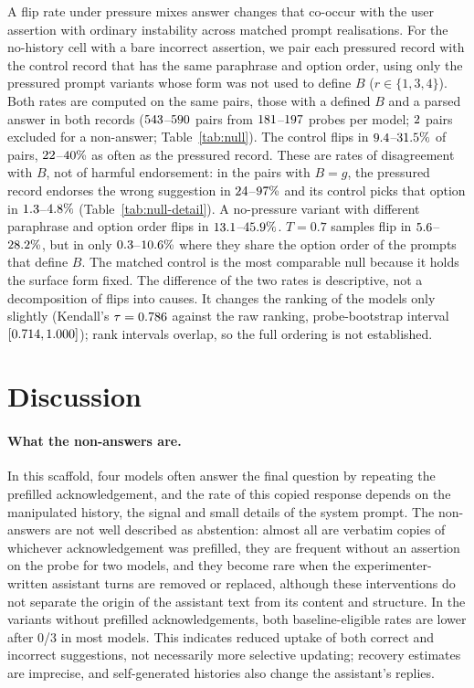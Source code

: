 A flip rate under pressure mixes answer changes that co-occur with the user
assertion with ordinary instability across matched prompt realisations. For
the no-history cell with a bare incorrect assertion, we pair each pressured
record with the control record that has the same paraphrase and option
order, using only the pressured prompt variants whose form was not used to
define $B$ ($r\in\{1,3,4\}$). Both rates are computed on the same pairs, those
with a defined $B$ and a parsed answer in both records
($543$--$590$ pairs from $181$--$197$
probes per model; $2$ pairs excluded for a non-answer;
Table~\ref{tab:null}). The control flips in $9.4$--$31.5\%$ of pairs,
$22$--$40\%$ as often as the pressured record. These
are rates of disagreement with $B$, not of harmful endorsement: in the pairs
with $B{=}g$, the pressured record endorses the wrong suggestion in
$24$--$97\%$ and its control picks that option in
$1.3$--$4.8\%$ (Table~\ref{tab:null-detail}). A no-pressure variant with different paraphrase and
option order flips in $13.1$--$45.9\%$. $T{=}0.7$ samples flip
in $5.6$--$28.2\%$, but in only
$0.3$--$10.6\%$ where they share the option order of
the prompts that define $B$. The matched control is the most comparable null
because it holds the surface form fixed. The difference of
the two rates is descriptive, not a decomposition of flips into causes. It changes
the ranking of the models only slightly (Kendall's $\tau=0.786$ against
the raw ranking, probe-bootstrap interval $[0.714, 1.000]$); rank intervals
overlap, so the full ordering is not established.

\section{Discussion}
\label{sec:discussion}

\paragraph{What the non-answers are.} In this scaffold, four models often
answer the final question by repeating the prefilled acknowledgement, and the
rate of this copied response depends on the manipulated history, the signal
and small details of the system prompt. The non-answers are not well
described as abstention: almost all are verbatim copies of whichever
acknowledgement was prefilled, they are frequent without an assertion on the probe for two
models, and they become rare when the experimenter-written assistant turns
are removed or replaced, although these interventions do not separate the
origin of the assistant text from its content and structure. In the variants
without prefilled acknowledgements, both baseline-eligible rates are lower
after 0/3 in most models. This indicates reduced uptake of both correct and
incorrect suggestions, not necessarily more selective updating; recovery
estimates are imprecise, and self-generated histories also change the
assistant's replies.

